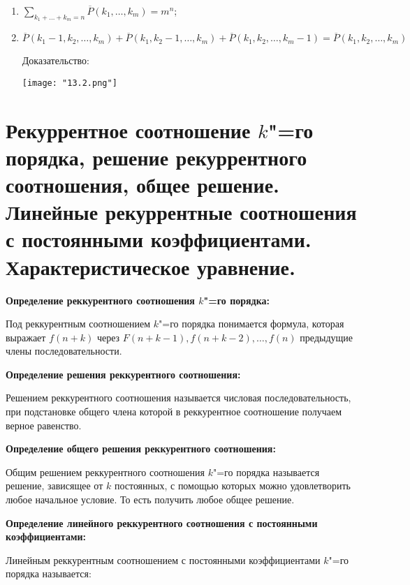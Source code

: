     \begin{enumerate}
        \item{$\sum\limits_{k_1 + \dots + k_m = n} \overline{P}(k_1, \dots, k_m) =
        m^n$;}
        \item{$\overline{P}(k_1 - 1, k_2, \dots, k_m) + 
        \overline{P}(k_1, k_2 - 1, \dots, k_m) + \overline{P}(k_1, k_2, \dots, k_m - 1) =
        \overline{P}(k_1, k_2, \dots, k_m)$
        \bigskip
        
        Доказательство:
        \bigskip
        
        \begin{center}
            \texttt{[image: "13.2.png"]}
        \end{center}
        }
    \end{enumerate}

\section{Рекуррентное соотношение $k$"=го порядка, решение рекуррентного соотношения, 
общее решение. Линейные рекуррентные соотношения с постоянными 
коэффициентами. Характеристическое уравнение.}    

\textbf{Определение реккурентного соотношения $k$"=го порядка:}
    \smallskip

    Под реккурентным соотношением $k$"=го порядка понимается формула,
    которая выражает $f(n + k)$ через $F(n + k - 1), f(n + k - 2), \dots,
    f(n)$ предыдущие члены последовательности.
    \bigskip

\textbf{Определение решения реккурентного соотношения:}
    \smallskip
    
    Решением реккурентного соотношения называется числовая последовательность,
    при подстановке общего члена которой в реккурентное соотношение получаем
    верное равенство.
    \bigskip

\textbf{Определение общего решения реккурентного соотношения:}
    \smallskip
    
    Общим решением реккурентного соотношения $k$"=го порядка называется
    решение, зависящее от $k$ постоянных, с помощью которых можно удовлетворить
    любое начальное условие. То есть получить любое общее решение.
    \bigskip

\textbf{Определение линейного реккурентного соотношения с постоянными
коэффициентами:}
    \smallskip
    
    Линейным реккурентным соотношением с постоянными коэффициентами $k$"=го порядка
    называется:
    \smallskip
    
